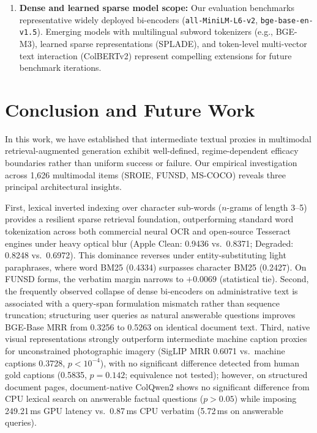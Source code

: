 \documentclass[conference]{IEEEtran}
\begin{document}
\begin{enumerate}
    \item \textbf{Dense and learned sparse model scope:} Our evaluation benchmarks representative widely deployed bi-encoders (\texttt{all-MiniLM-L6-v2}, \texttt{bge-base-en-v1.5}). Emerging models with multilingual subword tokenizers (e.g., BGE-M3), learned sparse representations (SPLADE), and token-level multi-vector text interaction (ColBERTv2) represent compelling extensions for future benchmark iterations.
\end{enumerate}

\section{Conclusion and Future Work}
\label{sec:conclusion}
In this work, we have established that intermediate textual proxies in multimodal retrieval-augmented generation exhibit well-defined, regime-dependent efficacy boundaries rather than uniform success or failure. Our empirical investigation across 1,626 multimodal items (SROIE, FUNSD, MS-COCO) reveals three principal architectural insights.

First, lexical inverted indexing over character sub-words ($n$-grams of length 3--5) provides a resilient sparse retrieval foundation, outperforming standard word tokenization across both commercial neural OCR and open-source Tesseract engines under heavy optical blur (Apple Clean: 0.9436 vs.\ 0.8371; Degraded: 0.8248 vs.\ 0.6972). This dominance reverses under entity-substituting light paraphrases, where word BM25 (0.4334) surpasses character BM25 (0.2427). On FUNSD forms, the verbatim margin narrows to $+0.0069$ (statistical tie). Second, the frequently observed collapse of dense bi-encoders on administrative text is associated with a query-span formulation mismatch rather than sequence truncation; structuring user queries as natural answerable questions improves BGE-Base MRR from 0.3256 to 0.5263 on identical document text. Third, native visual representations strongly outperform intermediate machine caption proxies for unconstrained photographic imagery (SigLIP MRR 0.6071 vs.\ machine captions 0.3728, $p < 10^{-4}$), with no significant difference detected from human gold captions (0.5835, $p=0.142$; equivalence not tested); however, on structured document pages, document-native ColQwen2 shows no significant difference from CPU lexical search on answerable factual questions ($p > 0.05$) while imposing 249.21\,ms GPU latency vs.\ 0.87\,ms CPU verbatim (5.72\,ms on answerable queries).
\end{document}
